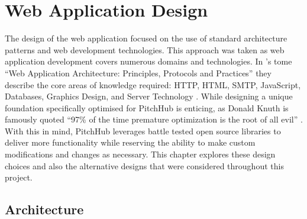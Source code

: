 
\chapter{Web Application Design}\label{C:design_web}
The design of the web application focused on the use of standard architecture patterns and web development technologies. This approach was taken as web application development covers numerous domains and technologies. In \citeauthor{shklar2009web}'s tome ``Web Application Architecture: Principles, Protocols and Practices'' they describe the core areas of knowledge required: HTTP, HTML, SMTP, JavaScript, Databases, Graphics Design, and Server Technology \cite{shklar2009web}. While designing a unique foundation specifically optimised for PitchHub is enticing, as Donald Knuth is famously quoted ``97\% of the time premature optimization is the root of all evil'' \cite{knuth1974structured}. With this in mind, PitchHub leverages battle tested open source libraries to deliver more functionality while reserving the ability to make custom modifications and changes as necessary. This chapter explores these design choices and also the alternative designs that were considered throughout this project.

\section{Architecture}

